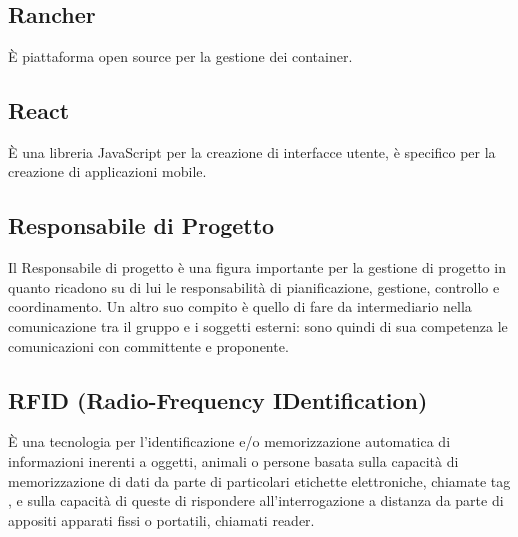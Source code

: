 \section{}

\subsection*{Rancher} È piattaforma open source per la gestione dei container.

\subsection*{React} È una libreria JavaScript per la creazione di interfacce utente, è specifico per la creazione di applicazioni mobile.

\subsection*{Responsabile di Progetto} Il Responsabile di progetto è una figura importante per la gestione di progetto in quanto ricadono su di lui le responsabilità di pianificazione, gestione, controllo e coordinamento. Un altro suo compito è quello di fare da intermediario nella comunicazione tra il gruppo e i soggetti esterni: sono quindi di sua competenza le comunicazioni con committente e proponente.

\subsection*{RFID (Radio-Frequency IDentification)} È una tecnologia per l'identificazione e/o memorizzazione automatica di informazioni inerenti a oggetti, animali o persone  basata sulla capacità di memorizzazione di dati da parte di particolari etichette elettroniche, chiamate tag , e sulla capacità di queste di rispondere all'interrogazione a distanza da parte di appositi apparati fissi o portatili, chiamati reader.
